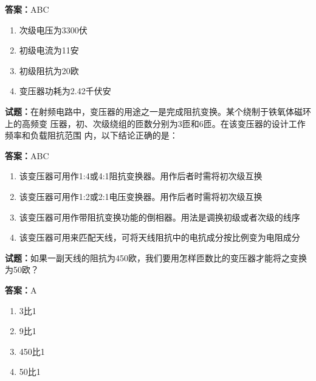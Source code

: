 \documentclass{ctexbook}
\begin{document}
\textbf{答案：}ABC 

\begin{enumerate}[leftmargin=3em]
  \item 次级电压为3300伏 

  \item 初级电流为11安 

  \item 初级阻抗为20欧 

  \item 变压器功耗为2.42千伏安 

\end{enumerate}





\vspace{1em}

\textbf{试题：}在射频电路中，变压器的用途之一是完成阻抗变换。某个绕制于铁氧体磁环上的高频变
压器，初、次级绕组的匝数分别为3匝和6匝。在该变压器的设计工作频率和负载阻抗范围
内，以下结论正确的是： 

\textbf{答案：}ABC 

\begin{enumerate}[leftmargin=3em]
  \item 该变压器可用作1:4或4:1阻抗变换器。用作后者时需将初次级互换 

  \item 该变压器可用作1:2或2:1电压变换器。用作后者时需将初次级互换 

  \item 该变压器可用作带阻抗变换功能的倒相器。用法是调换初级或者次级的线序 

  \item 该变压器可用来匹配天线，可将天线阻抗中的电抗成分按比例变为电阻成分 

\end{enumerate}





\vspace{1em}

\textbf{试题：}如果一副天线的阻抗为450欧，我们要用怎样匝数比的变压器才能将之变换为50欧？ 

\textbf{答案：}A 

\begin{enumerate}[leftmargin=3em]
  \item 3比1 

  \item 9比1 

  \item 450比1 

  \item 50比1 

\end{enumerate}
\end{document}
